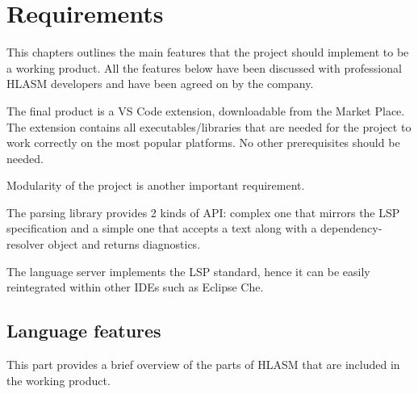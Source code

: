 \chapter{Requirements}

This chapters outlines the main features that the project should implement to be a working product. All the features below have been discussed with professional HLASM developers and have been agreed on by the company.

The final product is a VS Code extension, downloadable from the Market Place. The extension contains all executables/libraries that are needed for the project to work correctly on the most popular platforms. No other prerequisites should be needed.

Modularity of the project is another important requirement. 

The parsing library provides 2 kinds of API: complex one that mirrors the LSP specification and a simple one that accepts a text along with a dependency-resolver object and returns diagnostics. 

The language server implements the LSP standard, hence it can be easily reintegrated within other IDEs such as Eclipse Che.

\section{Language features}
This part provides a brief overview of the parts of HLASM that are included in the working product.

